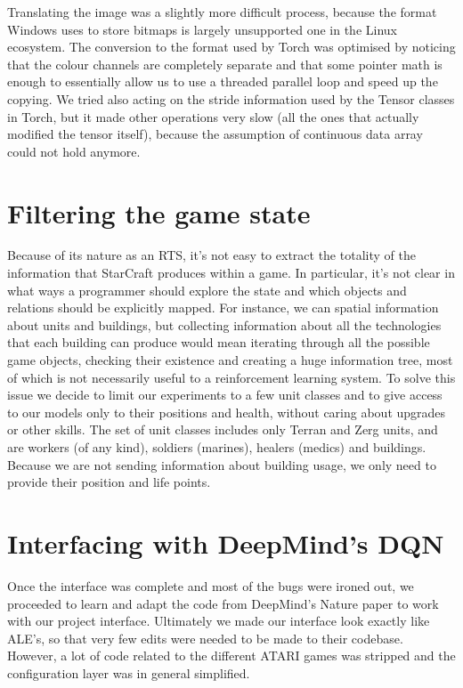 \documentclass[bsc,frontabs,twoside,singlespacing,parskip,deptreport]{infthesis}     %
\begin{document}
Translating the image was a slightly more difficult process, because the format
Windows uses to store bitmaps is largely unsupported one in the Linux ecosystem.
The conversion to the format used by Torch was optimised by noticing that the
colour channels are completely separate and that some pointer math is enough to
essentially allow us to use a threaded parallel loop and speed up the copying.
We tried also acting on the stride information used by the Tensor classes in
Torch, but it made other operations very slow (all the ones that actually
modified the tensor itself), because the assumption of continuous data array
could not hold anymore.

\section{Filtering the game state}

Because of its nature as an RTS, it's not easy to extract the totality of the
information that StarCraft produces within a game. In particular, it's not clear
in what ways a programmer should explore the state and which objects and
relations should be explicitly mapped. For instance, we can spatial information
about units and buildings, but collecting information about all the technologies
that each building can produce would mean iterating through all the possible
game objects, checking their existence and creating a huge information tree,
most of which is not necessarily useful to a reinforcement learning system. To
solve this issue we decide to limit our experiments to a few unit classes and to
give access to our models only to their positions and health, without caring
about upgrades or other skills. The set of unit classes includes only Terran and
Zerg units, and are workers (of any kind), soldiers (marines), healers (medics)
and buildings. Because we are not sending information about building usage, we
only need to provide their position and life points.

\section{Interfacing with DeepMind's DQN}

Once the interface was complete and most of the bugs were ironed out, we
proceeded to learn and adapt the code from DeepMind's Nature paper to work with
our project interface. Ultimately we made our interface look exactly like ALE's,
so that very few edits were needed to be made to their codebase. However, a lot
of code related to the different ATARI games was stripped and the configuration
layer was in general simplified.
\end{document}
